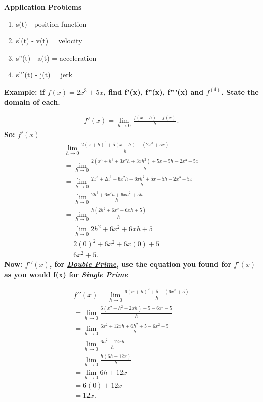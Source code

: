\documentclass{report}
\begin{document}
        \bigbreak \noindent 
        \begin{large}
            \textbf{Application Problems}
        \end{large}
        \begin{enumerate}
            \item s(t) - position function
            \item s'(t) - v(t) = velocity 
            \item s''(t) - a(t) = acceleration
            \item s'''(t) - j(t) = jerk
        \end{enumerate}
        \bigbreak \noindent \bigbreak \noindent 
        \begin{large}
            \textbf{Example: if $f(x) = 2x^3+5x$, find f'(x), f''(x), f'''(x) and $f^{(4)}$. State the domain of each.}
        \end{large}

        \bigbreak \noindent 
        \begin{align*}
            f\prime(x) = \lim\limits_{h \to 0}{ \frac{f(x+h) - f(x)}{h}}
        .\end{align*}
        \bigbreak \noindent 
        \textbf{So: $f\prime(x)$}
        \begin{align*}
            \lim\limits_{h \to 0}{ \frac{2(x+h)^3 + 5(x+h) - (2x^3 +5x)}{h}} \\ 
            = \lim\limits_{h \to 0}{ \frac{2(x^3+h^3+3x^2h+3xh^2) + 5x+5h -2x^3 -5x}{h}} \\
            = \lim\limits_{h \to 0}{ \frac{2x^3+2h^3+6x^2h+6xh^2 + 5x +5h-2x^3-5x}{h}} \\ 
            = \lim\limits_{h \to 0}{ \frac{2h^3+6x^2h+6xh^2+5h}{h}} \\ 
            = \lim\limits_{h \to 0}{ \frac{h(2h^2+6x^2+6xh+5)}{h}} \\ 
            = \lim\limits_{h \to 0}{2h^2+6x^2+6xh+5} \\
            = 2(0)^2+6x^2+6x(0)+5 \\ 
            = 6x^2 + 5
        .\end{align*}
        \bigbreak \noindent 
        \textbf{Now: $f\prime\prime(x)$, for \textbf{\textit{\underline{Double Prime}}}, use the equation you found for $f\prime(x)$ as you would f(x) for \textbf{\textit{Single Prime}}}

        \begin{align*}
            f\prime\prime(x) = \lim\limits_{h \to 0}{ \frac{6(x+h)^2 +5 - (6x^2+5)}{h}} \\ 
            = \lim\limits_{h \to 0}{ \frac{6(x^2+h^2+2xh)+5-6x^2-5}{h}} \\
            = \lim\limits_{h \to 0}{ \frac{6x^2+12xh+6h^2+5-6x^2-5}{h}} \\ 
            = \lim\limits_{h \to 0}{ \frac{6h^2+12xh}{h}} \\ 
            = \lim\limits_{h \to 0}{ \frac{h(6h+12x)}{h}} \\ 
            = \lim\limits_{h \to 0}{6h+12x} \\ 
            = 6(0) +12x \\ 
            = 12x
        .\end{align*}
        
\end{document}
